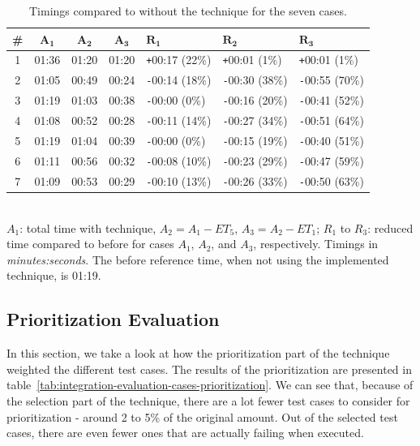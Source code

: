 \documentclass[a4paper,english,12pt]{report}
\def\plus{\texttt{+}}
\def\minus{\texttt{-}}
\begin{document}
\begin{table}[htbp]
  \centering
  \begin{tabular}{|c|c|c|c|l|l|l|}
    \hline
    \textbf{\#} & $\boldsymbol{A_1}$ & $\boldsymbol{A_2}$ & $\boldsymbol{A_3}$ & $\boldsymbol{R_1}$ & $\boldsymbol{R_2}$ & $\boldsymbol{R_3}$\\
    \hline
    1 & 01:36 & 01:20 & 01:20 & \plus 00:17 (22\%) & \plus 00:01 (1\%) & \plus 00:01 (1\%)\\
    \hline
    2 & 01:05 & 00:49 & 00:24 & \minus 00:14 (18\%) & \minus 00:30 (38\%) & \minus 00:55 (70\%)\\
    \hline
    3 & 01:19 & 01:03 & 00:38 & \minus 00:00 (0\%) & \minus 00:16 (20\%) & \minus 00:41 (52\%)\\
    \hline
    4 & 01:08 & 00:52 & 00:28 & \minus 00:11 (14\%) & \minus 00:27 (34\%) & \minus 00:51 (64\%)\\
    \hline
    5 & 01:19 & 01:04 & 00:39 & \minus 00:00 (0\%) & \minus 00:15 (19\%) & \minus 00:40 (51\%)\\
    \hline
    6 & 01:11 & 00:56 & 00:32 & \minus 00:08 (10\%) & \minus 00:23 (29\%) & \minus 00:47 (59\%)\\
    \hline
    7 & 01:09 & 00:53 & 00:29 & \minus 00:10 (13\%) & \minus 00:26 (33\%) & \minus 00:50 (63\%)\\
    \hline
  \end{tabular}
      {\\[2ex]\footnotesize$A_1$: total time with technique, $A_2=A_1-ET_5$, $A_3=A_2-ET_1$; $R_1$ to $R_3$: reduced time compared to before for cases $A_1$, $A_2$, and $A_3$, respectively. Timings in \textit{minutes:seconds}. The before reference time, when not using the implemented technique, is 01:19.}
  \caption{Timings compared to without the technique for the seven cases.}
  \label{tab:integration-evaluation-cases-timings-compared}
\end{table}

\subsection{Prioritization Evaluation}\label{sec:prioritization-evaluation}
In this section, we take a look at how the prioritization part of the technique weighted the different test cases. The results of the prioritization are presented in table~\vref{tab:integration-evaluation-cases-prioritization}. We can see that, because of the selection part of the technique, there are a lot fewer test cases to consider for prioritization - around 2 to 5\% of the original amount. Out of the selected test cases, there are even fewer ones that are actually failing when executed. 
\end{document}
